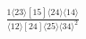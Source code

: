 \documentclass[varwidth, border=5pt]{standalone}
\begin{document}
\begin{my}
$\begin{gathered}
\scriptscriptstyle\frac{1⟨23⟩[15]⟨24⟩⟨14⟩}{⟨12⟩[24]⟨25⟩⟨34⟩^2}
\end{gathered}$
\end{my}
\end{document}
